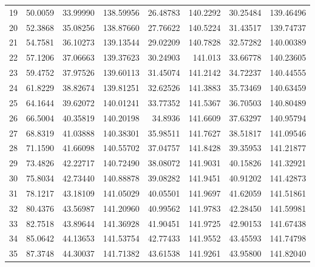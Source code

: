 \begin{table}[ht!]
{\begin{tabular}{@{}rrrrrrrr@{}}
19 & 50.0059 & 33.99990 & 138.59956 & 26.48783 & 140.2292 & 30.25484 & 139.46496 \\
20 & 52.3868 & 35.08256 & 138.87660 & 27.76622 & 140.5224 & 31.43517 & 139.74737 \\
21 & 54.7581 & 36.10273 & 139.13544 & 29.02209 & 140.7828 & 32.57282 & 140.00389 \\
22 & 57.1206 & 37.06663 & 139.37623 & 30.24903 & 141.013  & 33.66778 & 140.23605 \\
23 & 59.4752 & 37.97526 & 139.60113 & 31.45074 & 141.2142 & 34.72237 & 140.44555 \\
24 & 61.8229 & 38.82674 & 139.81251 & 32.62526 & 141.3883 & 35.73469 & 140.63459 \\
25 & 64.1644 & 39.62072 & 140.01241 & 33.77352 & 141.5367 & 36.70503 & 140.80489 \\
26 & 66.5004 & 40.35819 & 140.20198 & 34.8936  & 141.6609 & 37.63297 & 140.95794 \\
27 & 68.8319 & 41.03888 & 140.38301 & 35.98511 & 141.7627 & 38.51817 & 141.09546 \\
28 & 71.1590 & 41.66098 & 140.55702 & 37.04757 & 141.8428 & 39.35953 & 141.21877 \\
29 & 73.4826 & 42.22717 & 140.72490 & 38.08072 & 141.9031 & 40.15826 & 141.32921 \\
30 & 75.8034 & 42.73440 & 140.88878 & 39.08282 & 141.9451 & 40.91202 & 141.42873 \\
31 & 78.1217 & 43.18109 & 141.05029 & 40.05501 & 141.9697 & 41.62059 & 141.51861 \\
32 & 80.4376 & 43.56987 & 141.20960 & 40.99562 & 141.9783 & 42.28450 & 141.59981 \\
33 & 82.7518 & 43.89644 & 141.36928 & 41.90451 & 141.9725 & 42.90153 & 141.67438 \\
34 & 85.0642 & 44.13653 & 141.53754 & 42.77433 & 141.9552 & 43.45593 & 141.74798 \\
35 & 87.3748 & 44.30037 & 141.71382 & 43.61538 & 141.9261 & 43.95800 & 141.82040 \\ \bottomrule
\end{tabular}%
}
\end{table}
\vfill
\clearpage

